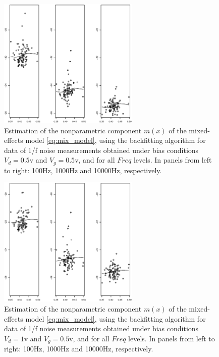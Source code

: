 \documentclass[sn-mathphys]{sn-jnl}%
\theoremstyle{thmstyleone}%
\theoremstyle{thmstyletwo}%
\theoremstyle{thmstylethree}%
\begin{document}
\begin{figure}[ht]
	\centerline{\includegraphics [width=0.6\textwidth]{Fig8_elognoise_d05g05.eps}}
	\caption{Estimation of the nonparametric component $m(x)$ of the mixed-effects model \eqref{eq:mix_model}, using the backfitting algorithm for data of 1/f noise measurements obtained under bias conditions $V_d=0.5$v and $V_g=0.5$v, and for all $Freq$ levels. In panels from left to right: 100Hz, 1000Hz and 10000Hz, respectively.}
	\label{fig:backfit1}
\end{figure}
\begin{figure}[ht]
	\centerline{\includegraphics [width=0.6\textwidth]{Fig9_elognoise_d1g05.eps}}
	\caption{Estimation of the nonparametric component $m(x)$ of the mixed-effects model \eqref{eq:mix_model}, using the backfitting algorithm for data of 1/f noise measurements obtained under bias conditions $V_d=1$v and $V_g=0.5$v, and for all $Freq$ levels. In panels from left to right: 100Hz, 1000Hz and 10000Hz, respectively.}
	\label{fig:backfit2}
\end{figure}
\end{document}
